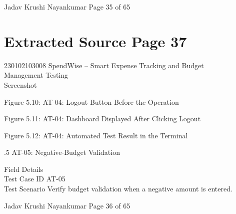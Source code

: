 \documentclass[12pt,a4paper]{report}
\begin{document}
\smallskip

\smallskip

\smallskip

\smallskip
Jadav Krushi Nayankumar                                                         Page 35 of 65\\ 

\clearpage
\section*{Extracted Source Page 37}
230102103008                          SpendWise – Smart Expense Tracking and Budget\\ 
Management Testing\\ 

\smallskip
Screenshot\\ 

\smallskip

\smallskip

\smallskip

\smallskip
Figure 5.10: AT-04: Logout Button Before the Operation\\ 

\smallskip

\smallskip

\smallskip

\smallskip
Figure 5.11: AT-04: Dashboard Displayed After Clicking Logout\\ 

\smallskip

\smallskip

\smallskip

\smallskip
Figure 5.12: AT-04: Automated Test Result in the Terminal\\ 

\smallskip

\smallskip

.5 AT-05: Negative-Budget Validation\\ 

\smallskip

\smallskip
Field                     Details\\ 
Test Case ID              AT-05\\ 
Test Scenario             Verify budget validation when a negative amount is entered.\\ 

\smallskip

\smallskip

\smallskip
Jadav Krushi Nayankumar                                                        Page 36 of 65\\ 
\end{document}
